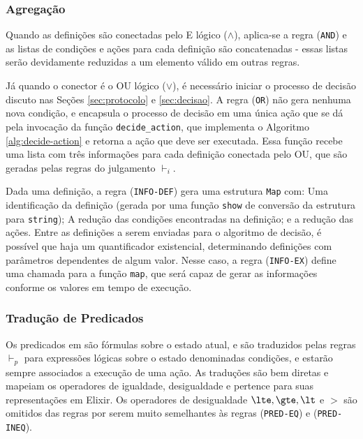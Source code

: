 \subsubsection{Agregação}


Quando as definições são conectadas pelo E lógico ($\land$), aplica-se a regra
(\texttt{AND}) e as listas de
condições e ações para cada definição são concatenadas - essas listas serão
devidamente reduzidas a um elemento válido em outras regras.

Já quando o conector é o OU lógico ($\lor$), é necessário iniciar o processo de decisão
discuto nas Seções \ref{sec:protocolo} e \ref{sec:decisao}. A regra
(\texttt{OR}) não gera nenhuma nova condição, e encapsula o processo de decisão
em uma única ação que se dá pela invocação da função \texttt{decide\_action},
que implementa o Algoritmo \ref{alg:decide-action} e retorna a ação que deve ser
executada. Essa função recebe uma lista com três informações para cada definição conectada
pelo OU, que são geradas pelas regras do julgamento $\vdash_i$.

Dada uma definição, a regra (\texttt{INFO-DEF}) gera uma estrutura \texttt{Map}
com: Uma identificação da definição (gerada por uma função \texttt{show} de
conversão da estrutura para \texttt{string}); A redução das condições
encontradas na definição; e a redução das ações. Entre as definições a serem
enviadas para o algoritmo de decisão, é possível que haja um quantificador
existencial, determinando definições com parâmetros dependentes
de algum valor. Nesse caso, a regra (\texttt{INFO-EX}) define uma chamada para a
função \texttt{map}, que será capaz de gerar as informações conforme os valores
em tempo de execução.


\subsubsection{Tradução de Predicados}

Os predicados em \TLA são fórmulas sobre o estado atual, e são traduzidos pelas
regras $\vdash_p$ para expressões lógicas sobre o estado denominadas condições, e estarão sempre
associados a execução de uma ação. As traduções são bem diretas e mapeiam os
operadores de igualdade, desigualdade e pertence para suas representações em
Elixir. Os operadores de desigualdade $\lte, \gte, \lt$ e $\gt$ são omitidos das
regras por serem muito semelhantes às regras (\texttt{PRED-EQ}) e (\texttt{PRED-INEQ}).



